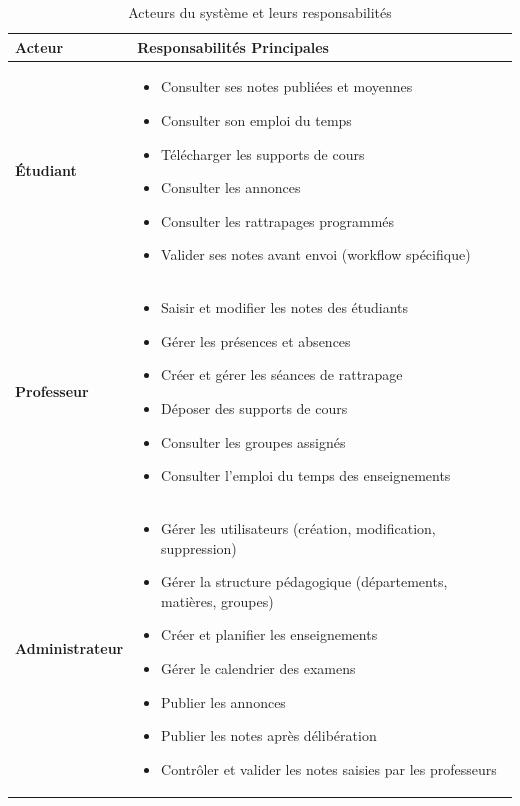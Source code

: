\documentclass[12pt,a4paper]{report}
\begin{document}
\begin{table}[H]
\centering
\caption{Acteurs du système et leurs responsabilités}
\begin{tabular}{|p{3cm}|p{11cm}|}
\hline
\textbf{Acteur} & \textbf{Responsabilités Principales} \\
\hline
\textbf{Étudiant} & 
\begin{itemize}[leftmargin=*, nosep]
    \item Consulter ses notes publiées et moyennes
    \item Consulter son emploi du temps
    \item Télécharger les supports de cours
    \item Consulter les annonces
    \item Consulter les rattrapages programmés
    \item Valider ses notes avant envoi (workflow spécifique)
\end{itemize} \\
\hline
\textbf{Professeur} & 
\begin{itemize}[leftmargin=*, nosep]
    \item Saisir et modifier les notes des étudiants
    \item Gérer les présences et absences
    \item Créer et gérer les séances de rattrapage
    \item Déposer des supports de cours
    \item Consulter les groupes assignés
    \item Consulter l'emploi du temps des enseignements
\end{itemize} \\
\hline
\textbf{Administrateur} & 
\begin{itemize}[leftmargin=*, nosep]
    \item Gérer les utilisateurs (création, modification, suppression)
    \item Gérer la structure pédagogique (départements, matières, groupes)
    \item Créer et planifier les enseignements
    \item Gérer le calendrier des examens
    \item Publier les annonces
    \item Publier les notes après délibération
    \item Contrôler et valider les notes saisies par les professeurs
\end{itemize} \\
\hline
\end{tabular}
\end{table}
\end{document}

